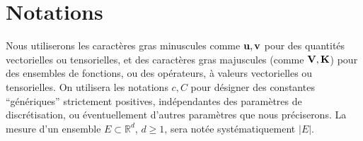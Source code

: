 \documentclass[11pt]{book}
\def\u{{\bf u}}
\def\vv{{\bf v}}
\def\V{{\bf V}}
\def\K{{\bf K}}
\newcommand{\R}{\mathbb{R}}
\begin{document}
\section{Notations}

Nous utiliserons les caractères gras minuscules comme $\u,\vv$ pour des quantités vectorielles ou tensorielles, et des caractères gras majuscules (comme $\V,\K$) pour des ensembles de fonctions, ou des opérateurs, à valeurs vectorielles ou tensorielles. On utilisera les notations $c, C$ pour désigner des constantes ``génériques'' strictement positives, indépendantes des paramètres de discrétisation, ou éventuellement d'autres paramètres que nous préciserons. La mesure d'un ensemble $E \subset \R^d$, $d\geq1$, sera notée systématiquement $|E|$.

 
\end{document}
